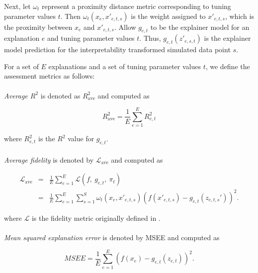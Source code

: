 \documentclass[AMS,STIX2COL]{WileyNJD-v2}\usepackage[]{graphicx}\usepackage[]{color}
\begin{document}
Next, let $\omega_t$ represent a proximity distance metric corresponding to tuning parameter values $t$. Then $\omega_t\left(x_e, x'_{e,t,s}\right)$ is the weight assigned to $x'_{e,t,s}$, which is the proximity between $x_e$ and $x'_{e,t,s}$. Allow $g_{e,t}$ to be the explainer model for an explanation $e$ and tuning parameter values $t$. Thus, $g_{e,t}\left(z'_{e,s,t}\right)$ is the explainer model prediction for the interpretability transformed simulated data point $s$.

For a set of $E$ explanations and a set of tuning parameter values $t$, we define the assessment metrics as follows:\\
\\
\emph{Average $R^2$} is denoted as $R^2_{\mbox{ave}}$ and computed as

  $$R^2_{\mbox{ave}} = \frac{1}{E}\sum_{e=1}^E R_{e,t}^2$$

\noindent where $R_{e,t}^2$ is the $R^2$ value for $g_{e,t}$.\\
\\
\emph{Average fidelity} is denoted by $\mathcal{L}_{\mbox{ave}}$ and computed as

\begin{eqnarray*} \mathcal{L}_{\mbox{ave}} & = & \frac{1}{E}\sum_{e=1}^E\mathcal{L}(f, \ g_{e,t}, \ \pi_{t}) \\ & = & \frac{1}{E}\sum_{e=1}^E\sum_{s=1}^{S}\omega_{t}\left(x_e, x'_{e,t,s}\right)\left(f\left(x'_{e,t,s}\right)-g_{e,t}\left(z_{e,t,s}'\right)\right)^2. \end{eqnarray*}

\noindent where $\mathcal{L}$ is the fidelity metric originally defined in \citet{ribeiro:2016}.\\
\\
\emph{Mean squared explanation error} is denoted by MSEE and computed as

$$MSEE=\frac{1}{E}\sum_{e=1}^E\left(f\left(x_e\right)-g_{e,t}\left(z_{e,t}\right)\right)^2.$$
\end{document}
